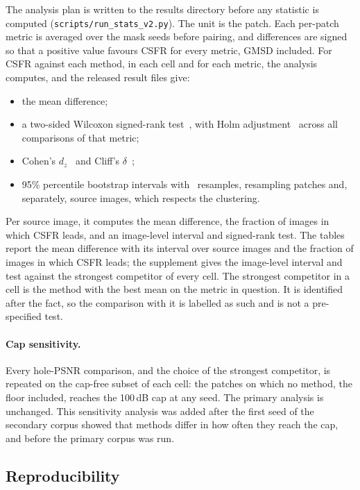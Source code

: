 \documentclass[final,3p]{elsarticle}
\begin{document}
The analysis plan is written to the results directory before any statistic is computed (\texttt{scripts/\allowbreak run\allowbreak\_stats\allowbreak\_v2.py}). The unit is the patch. Each per-patch metric is averaged over the mask seeds before pairing, and differences are signed so that a positive value favours CSFR for every metric, GMSD included. For CSFR against each method, in each cell and for each metric, the analysis computes, and the released result files give:
\begin{itemize}
  \item the mean difference;
  \item a two-sided Wilcoxon signed-rank test~\cite{wilcoxon1945individual}, with Holm adjustment~\cite{holm1979simple} across all comparisons of that metric;
  \item Cohen's $d_{z}$~\cite{cohen1988statistical} and Cliff's $\delta$~\cite{cliff1993dominance};
  \item 95\% percentile bootstrap intervals with \statsBoot\ resamples, resampling patches and, separately, source images, which respects the clustering.
\end{itemize}
Per source image, it computes the mean difference, the fraction of images in which CSFR leads, and an image-level interval and signed-rank test. The tables report the mean difference with its interval over source images and the fraction of images in which CSFR leads; the supplement gives the image-level interval and test against the strongest competitor of every cell. The strongest competitor in a cell is the method with the best mean on the metric in question. It is identified after the fact, so the comparison with it is labelled as such and is not a pre-specified test.

\paragraph{Cap sensitivity.} Every hole-PSNR comparison, and the choice of the strongest competitor, is repeated on the cap-free subset of each cell: the patches on which no method, the floor included, reaches the 100\,dB cap at any seed. The primary analysis is unchanged. This sensitivity analysis was added after the first seed of the secondary corpus showed that methods differ in how often they reach the cap, and before the primary corpus was run.

\subsection{Reproducibility}
\label{sec:protocol}
\end{document}

